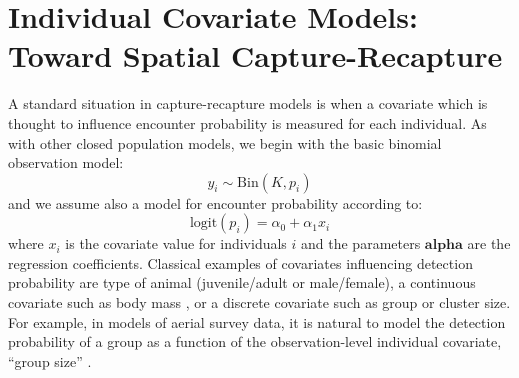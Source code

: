 \section{Individual Covariate Models: Toward Spatial Capture-Recapture}
\label{closed.sec.indcov}


A standard situation in capture-recapture models is when a
covariate which is thought
 to influence
encounter probability is measured for each individual.
As with other closed population models, we
begin with the basic binomial observation model:
\[
y_{i} \sim \mbox{Bin}(K, p_{i})
\]
and we assume also  a model for encounter probability according to:
\begin{equation}
 \mbox{logit}(p_{i}) = \alpha_0 + \alpha_1 x_{i}
\label{closed.eq.ha}
\end{equation}
where $x_i$ is the covariate value for individuals $i$ and the
parameters $\bm{alpha}$ are the regression coefficients. Classical examples of covariates influencing detection probability are
type of animal (juvenile/adult or male/female), a continuous covariate
such as body mass \citep[][ch. 6]{royle_dorazio:2008}, or a
discrete covariate such as group or cluster size. For example, in
models of aerial survey data, it is natural to model the detection
probability of a group as a function of the observation-level individual
covariate, ``group size'' \citep{royle:2008, royle:2009, langtimm_etal:2011}.

